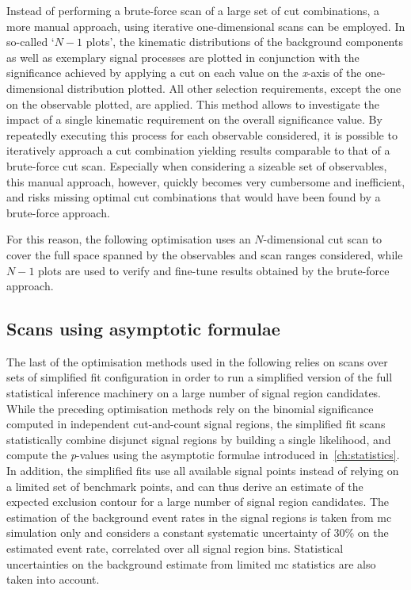 Instead of performing a brute-force scan of a large set of cut combinations, a more manual approach, using iterative one-dimensional scans can be employed. In so-called `$N-1$ plots', the kinematic distributions of the background components as well as exemplary signal processes are plotted in conjunction with the significance achieved by applying a cut on each value on the \textit{x}-axis of the one-dimensional distribution plotted. All other selection requirements, except the one on the observable plotted, are applied. This method allows to investigate the impact of a single kinematic requirement on the overall significance value. By repeatedly executing this process for each observable considered, it is possible to iteratively approach a cut combination yielding results comparable to that of a brute-force cut scan. Especially when considering a sizeable set of observables, this manual approach, however, quickly becomes very cumbersome and inefficient, and risks missing optimal cut combinations that would have been found by a brute-force approach.

For this reason, the following optimisation uses an $N$-dimensional cut scan to cover the full space spanned by the observables and scan ranges considered, while $N-1$ plots are used to verify and fine-tune results obtained by the brute-force approach.

\subsection{Scans using asymptotic formulae}\label{sec:fit-scan}

The last of the optimisation methods used in the following relies on scans over sets of simplified fit configuration in order to run a simplified version of the full statistical inference machinery on a large number of signal region candidates.
While the preceding optimisation methods rely on the binomial significance computed in independent cut-and-count signal regions, the simplified fit scans statistically combine disjunct signal regions by building a single likelihood, and compute the \textit{p}-values using the asymptotic formulae introduced in~\cref{ch:statistics}.
In addition, the simplified fits use all available signal points instead of relying on a limited set of benchmark points, and can thus derive an estimate of the expected exclusion contour for a large number of signal region candidates.
The estimation of the background event rates in the signal regions is taken from \gls{mc} simulation only and considers a constant systematic uncertainty of 30\% on the estimated event rate, correlated over all signal region bins. Statistical uncertainties on the background estimate from limited \gls{mc} statistics are also taken into account. 

